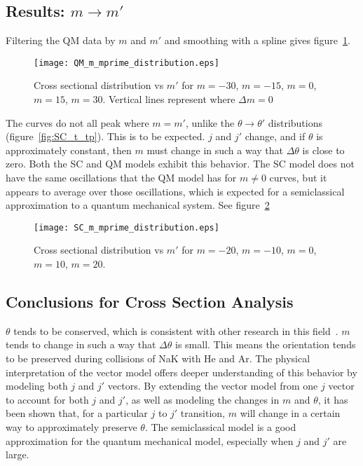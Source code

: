 \documentclass[letterpaper,titlepage,12pt]{article}
\begin{document}
\subsection{Results: $m\rightarrow m'$}
Filtering the QM data by $m$ and $m'$ and smoothing with a spline gives
figure~\ref{fig:He_cs_m_mp}.
\begin{figure}[ht!]
    \centering
    \texttt{[image: QM\_m\_mprime\_distribution.eps]}
    \caption{Cross sectional distribution vs $m'$ for $m=-30$, $m=-15$, $m=0$, $m=15$, $m=30$. Vertical lines represent where $\Delta m=0$} 
\label{fig:He_cs_m_mp}
\end{figure}
The curves do not all peak where $m=m'$, unlike
the $\theta\rightarrow\theta'$ distributions (figure~\ref{fig:SC_t_tp}).  This
is to be expected.  $j$ and $j'$ change, and if $\theta$ is approximately
constant, then $m$ must change in such a way that $\Delta\theta$ is close to
zero.  Both the SC and QM models exhibit this behavior.  The SC model does not
have the same oscillations that the QM model has for $m\neq0$ curves, but it
appears to average over those oscillations, which is expected for a
semiclassical approximation to a quantum mechanical system.  See
figure~\ref{fig:He_cs_m_mp_comp}
\begin{figure}[ht!]
    \centering
    \texttt{[image: SC\_m\_mprime\_distribution.eps]}
    \caption{Cross sectional distribution vs $m'$ for $m=-20$, $m=-10$, $m=0$, $m=10$, $m=20$.}
\label{fig:He_cs_m_mp_comp}
\end{figure}

\subsection{Conclusions for Cross Section Analysis}
$\theta$ tends to be conserved, which is consistent with other research in this
field~\cite{Ale83}. $m$ tends to change in such a way that $\Delta\theta$ is
small.  This means the orientation tends to be preserved during collisions of
NaK with He and Ar.  The physical interpretation of the vector model offers
deeper understanding of this behavior by modeling both $j$ and $j'$ vectors.
By extending the vector model from one $j$ vector to account for both $j$ and
$j'$, as well as modeling the changes in $m$ and $\theta$, it has been shown
that, for a particular $j$ to $j'$ transition, $m$ will change in a certain way
to approximately preserve $\theta$.  The semiclassical model is a good
approximation for the quantum mechanical model, especially when $j$ and $j'$
are large.
\end{document}

